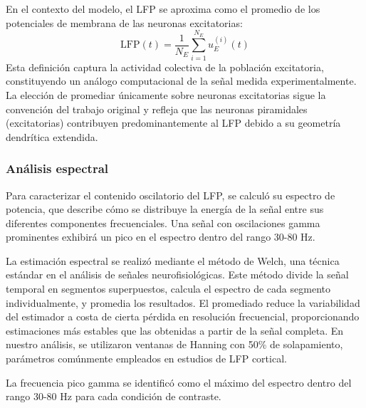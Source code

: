   En el contexto del modelo, el \acrshort{LFP} se aproxima como el promedio de los potenciales de 
  membrana de las neuronas excitatorias:
  \begin{equation}
      \text{LFP}(t) = \frac{1}{N_E} \sum_{i=1}^{N_E} u_E^{(i)}(t)
  \end{equation}
  Esta definición captura la actividad colectiva de la población excitatoria, constituyendo un 
  análogo computacional de la señal medida experimentalmente. La elección de promediar únicamente 
  sobre neuronas excitatorias sigue la convención del trabajo original y refleja que las neuronas 
  piramidales (excitatorias) contribuyen predominantemente al \acrshort{LFP} debido a su geometría 
  dendrítica extendida.

  \subsubsection{Análisis espectral}
 Para caracterizar el contenido oscilatorio del \acrshort{LFP}, se calculó su espectro de potencia, 
que describe cómo se distribuye la energía de la señal entre sus diferentes componentes 
frecuenciales. Una señal con oscilaciones gamma prominentes exhibirá un pico en el espectro 
dentro del rango 30-80 Hz.

La estimación espectral se realizó mediante el método de Welch, una técnica estándar en el 
análisis de señales neurofisiológicas. Este método divide la señal temporal en segmentos 
superpuestos, calcula el espectro de cada segmento individualmente, y promedia los resultados. 
El promediado reduce la variabilidad del estimador a costa de cierta pérdida en resolución 
frecuencial, proporcionando estimaciones más estables que las obtenidas a partir de la señal 
completa. En nuestro análisis, se utilizaron ventanas de Hanning con 50\% de solapamiento, 
parámetros comúnmente empleados en estudios de \acrshort{LFP} cortical.

La frecuencia pico gamma se identificó como el máximo del espectro dentro del rango 30-80 Hz 
para cada condición de contraste.

